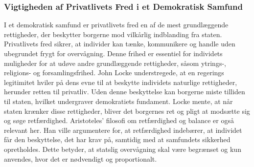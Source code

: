 \subsubsection{Vigtigheden af Privatlivets Fred i et Demokratisk Samfund}
I et demokratisk samfund er privatlivets fred en af de mest grundlæggende rettigheder, der beskytter borgerne mod vilkårlig indblanding fra staten. Privatlivets fred sikrer, at individer kan tænke, kommunikere og handle uden ubegrundet frygt for overvågning. Denne frihed er essentiel for individets muligheder for at udøve andre grundlæggende rettigheder, såsom ytrings-, religions- og forsamlingsfrihed. John Locke understregede, at en regerings legitimitet hviler på dens evne til at beskytte individets naturlige rettigheder, herunder retten til privatliv. Uden denne beskyttelse kan borgerne miste tilliden til staten, hvilket undergraver demokratiets fundament. Locke mente, at når staten krænker disse rettigheder, bliver det borgernes ret og pligt at modsætte sig og søge retfærdighed. Aristoteles' filosofi om retfærdighed og balance er også relevant her. Han ville argumentere for, at retfærdighed indebærer, at individet får den beskyttelse, det har krav på, samtidig med at samfundets sikkerhed opretholdes. Dette betyder, at statslig overvågning skal være begrænset og kun anvendes, hvor det er nødvendigt og proportionalt.

\newpage